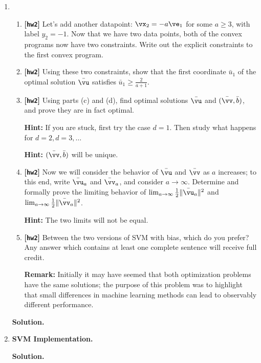 \documentclass{article}
\def\hw{\textbf{[\texttt{hw2}]}\xspace}
\theoremstyle{definition}
\theoremstyle{remark}
\newenvironment{Q}
{%
\clearpage
\item
}
{%
\phantom{s}%
\bigskip%
\noindent\textbf{Solution.}
}
\begin{document}
\begin{enumerate}[font={\Large\bfseries},leftmargin=0pt]
\begin{Q}
\begin{enumerate}
    \item
      \hw Let's add another datapoint: $\vx_2 = -a\ve_1$ for some $a\geq 3$, with label $y_2 = -1$.
      Now that we have two data points, both of the convex programs now have two constraints.
      Write out the explicit constraints to the first convex program.

    \item
      \hw Using these two constraints, show that the first coordinate
      $\bar u_1$ of the optimal solution $\bar \vu$ satisfies $\bar u_1 \geq \frac{2}{a+1}$.

    \item
      \hw Using parts (c) and (d), find optimal solutions $\bar\vu$ and $(\bar\vv,\bar b)$, and prove they are in fact optimal.

      \textbf{Hint:} If you are stuck, first try the case $d=1$. Then study what happens for $d=2,d=3,\ldots$

      \textbf{Hint:} $(\bar\vv,\bar b)$ will be unique.

    \item
      \hw Now we will consider the behavior of $\bar\vu$ and $\bar\vv$ as $a$ increases;
      to this end, write $\bar\vu_a$ and $\bar\vv_a$, and consider $a\to\infty$.
      Determine and formally prove the limiting behavior of
      $\lim_{a\to\infty}\frac 1 2 \|\bar\vu_a\|^2$ and $\lim_{a\to\infty}\frac 1 2 \|\bar\vv_a\|^2$.

      \textbf{Hint:} The two limits will not be equal.

    \item
      \hw Between the two versions of SVM with bias, which do you prefer?
      Any answer which contains at least one complete sentence will receive full credit.

      \textbf{Remark:} Initially it may have seemed that both optimization problems have
      the same solutions; the purpose of this problem was to highlight that small differences
      in machine learning methods can lead to observably different performance.
  \end{enumerate}
\end{Q}
  
\begin{Q}
    \textbf{\Large SVM Implementation.}
    

\end{Q}
\end{enumerate}
\end{document}
